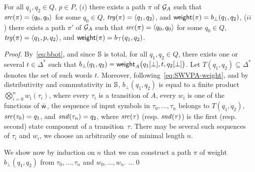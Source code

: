 \begin{lemma}[Completeness]
For all $q_1, q_2 \in Q$, $p\in P$, 
($i$) there exists a path $\pi$ of $\mathcal{G}_A$ 
such that $\src(\pi) = \<q_0, q_0>$ for some $q_0 \in Q$, 
$\trg(\pi) = \< q_1, q_2>$,
and $\mathsf{weight}(\pi) = b_\bot(q_1, q_2)$, 
($ii$) there exists a path $\pi'$ of $\mathcal{G}_A$ 
such that $\src(\pi) = \<q_0, q_0>$ for some $q_0 \in Q$, 
$\trg(\pi) = \< q_1, p, q_2>$,
and $\mathsf{weight}(\pi) = b_\top(q_1, q_2)$.
\end{lemma}
%
\begin{proof}
By~\eqref{eq:bbot}, 
and since $\mathbb{S}$ is total, for all $q_1, q_2 \in Q$, 
there exists one or several $t \in \Delta^*$ such that  
$b_\bot(q_1, q_2) = \mathsf{weight}_A\bigl(q_1[{\bot}], t, q_2[{\bot}]\bigr)$.
Let $T(q_1, q_2) \subseteq \Delta^*$ denotes the set of such words $t$. %
%
Moreover, following~\eqref{eq:SWVPA-weight}, and by distributivity and commutativity in $\mathbb{S}$, 
$b_\bot(q_1, q_2)$ is equal to a finite product $\bigotimes_{i=0}^n w_i(\tau_i)$, 
where every $\tau_i$ is a transition of $A$, every $w_i$ is one of the functions of $\bar{\mathsf{w}}$,
the sequence of input symbols in $\tau_0,\ldots, \tau_n$ belongs to $T(q_1, q_2)$, 
$\mathit{src}(\tau_0) = q_1$, and $\mathit{snd}(\tau_n) = q_2$, where 
$\mathit{src}(\tau)$ (resp. $\mathit{snd}(\tau)$) is the first (resp. second) state component of a transition~$\tau$.
There may be several such sequences of $\tau_i$ and $w_i$, we choose an arbitrarily one of minimal length $n$.


We show now by induction on $n$ that we can construct a path $\pi$ of weight $b_\bot(q_1, q_2)$
from $\tau_0,\ldots, \tau_n$ and $w_0,\ldots, w_n$. ...\qed
\end{proof}




